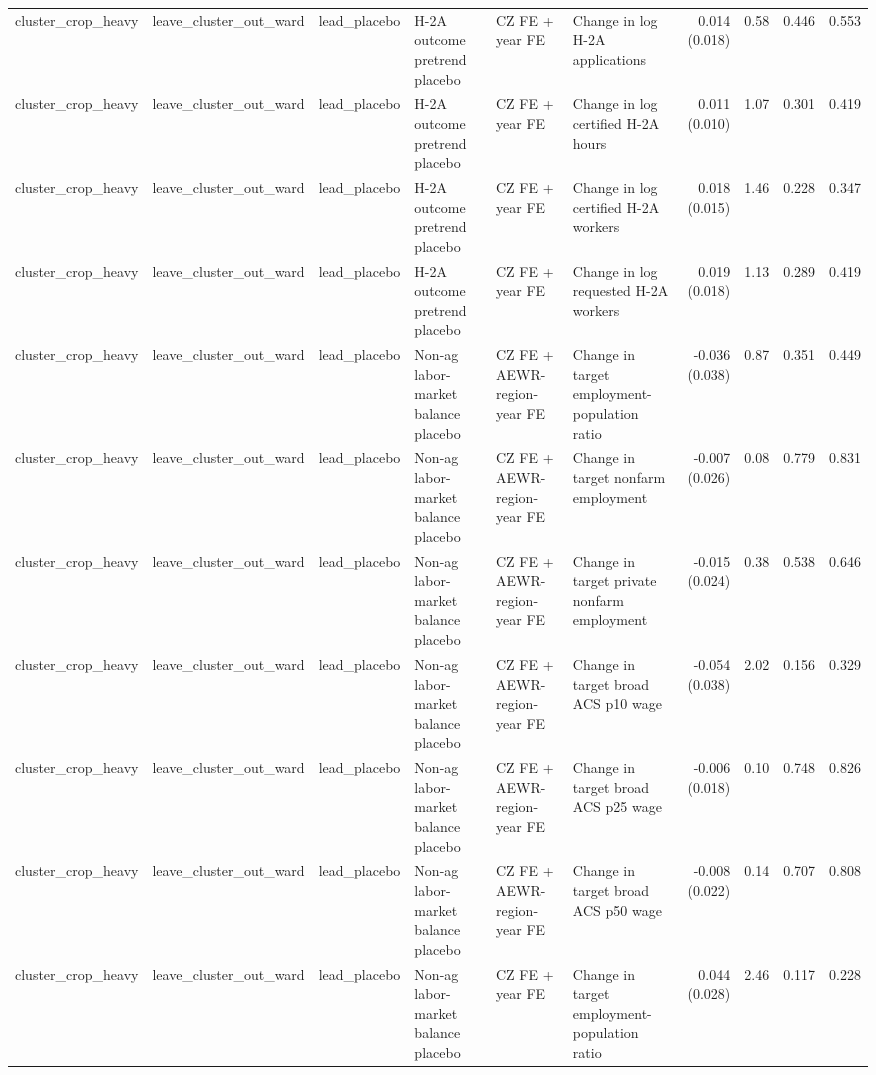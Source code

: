 \begin{tabular}{llllllrrrr}
cluster_crop_heavy & leave_cluster_out_ward & lead_placebo & H-2A outcome pretrend placebo & CZ FE + year FE & Change in log H-2A applications & 0.014 (0.018) & 0.58 & 0.446 & 0.553 \\
cluster_crop_heavy & leave_cluster_out_ward & lead_placebo & H-2A outcome pretrend placebo & CZ FE + year FE & Change in log certified H-2A hours & 0.011 (0.010) & 1.07 & 0.301 & 0.419 \\
cluster_crop_heavy & leave_cluster_out_ward & lead_placebo & H-2A outcome pretrend placebo & CZ FE + year FE & Change in log certified H-2A workers & 0.018 (0.015) & 1.46 & 0.228 & 0.347 \\
cluster_crop_heavy & leave_cluster_out_ward & lead_placebo & H-2A outcome pretrend placebo & CZ FE + year FE & Change in log requested H-2A workers & 0.019 (0.018) & 1.13 & 0.289 & 0.419 \\
cluster_crop_heavy & leave_cluster_out_ward & lead_placebo & Non-ag labor-market balance placebo & CZ FE + AEWR-region-year FE & Change in target employment-population ratio & -0.036 (0.038) & 0.87 & 0.351 & 0.449 \\
cluster_crop_heavy & leave_cluster_out_ward & lead_placebo & Non-ag labor-market balance placebo & CZ FE + AEWR-region-year FE & Change in target nonfarm employment & -0.007 (0.026) & 0.08 & 0.779 & 0.831 \\
cluster_crop_heavy & leave_cluster_out_ward & lead_placebo & Non-ag labor-market balance placebo & CZ FE + AEWR-region-year FE & Change in target private nonfarm employment & -0.015 (0.024) & 0.38 & 0.538 & 0.646 \\
cluster_crop_heavy & leave_cluster_out_ward & lead_placebo & Non-ag labor-market balance placebo & CZ FE + AEWR-region-year FE & Change in target broad ACS p10 wage & -0.054 (0.038) & 2.02 & 0.156 & 0.329 \\
cluster_crop_heavy & leave_cluster_out_ward & lead_placebo & Non-ag labor-market balance placebo & CZ FE + AEWR-region-year FE & Change in target broad ACS p25 wage & -0.006 (0.018) & 0.10 & 0.748 & 0.826 \\
cluster_crop_heavy & leave_cluster_out_ward & lead_placebo & Non-ag labor-market balance placebo & CZ FE + AEWR-region-year FE & Change in target broad ACS p50 wage & -0.008 (0.022) & 0.14 & 0.707 & 0.808 \\
cluster_crop_heavy & leave_cluster_out_ward & lead_placebo & Non-ag labor-market balance placebo & CZ FE + year FE & Change in target employment-population ratio & 0.044 (0.028) & 2.46 & 0.117 & 0.228 \\

\end{tabular}
